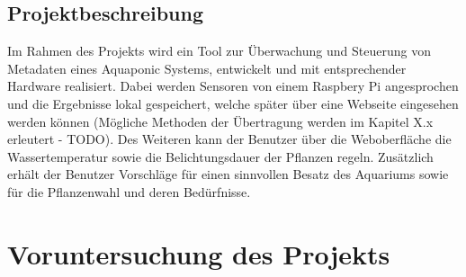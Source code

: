 \documentclass[11pt]{article}
\begin{document}
\subsection{Projektbeschreibung}
Im Rahmen des Projekts wird ein Tool zur \"Uberwachung und Steuerung von Metadaten eines Aquaponic Systems, entwickelt und mit entsprechender Hardware realisiert. Dabei werden Sensoren von einem Raspbery Pi angesprochen und die Ergebnisse lokal gespeichert, welche sp\"ater \"uber eine Webseite eingesehen werden k\"onnen (M\"ogliche Methoden der \"Ubertragung werden im Kapitel X.x erleutert - TODO). Des Weiteren kann der Benutzer \"uber die Weboberfl\"ache die Wassertemperatur sowie die Belichtungsdauer der Pflanzen regeln. Zusätzlich erh\"alt der Benutzer Vorschl\"age f\"ur einen sinnvollen Besatz des Aquariums sowie f\"ur die Pflanzenwahl und deren Bed\"urfnisse.

\section{Voruntersuchung des Projekts}
\end{document}
